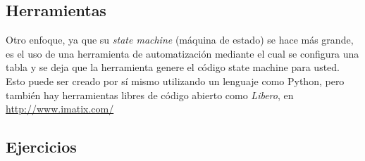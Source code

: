 \subsection*{Herramientas}
\label{subsec:Herramientas}

Otro enfoque, ya que su \textit{state machine} (máquina de estado) se hace más grande, es el uso de una herramienta de automatización mediante el cual se configura una tabla y se deja que la herramienta genere el código state machine para usted. Esto puede ser creado por sí mismo utilizando un lenguaje como Python, pero también hay herramientas libres de código abierto como \textit{Libero}, en \url{http://www.imatix.com/} \newline 


\subsection*{Ejercicios}
\label{subsec:Ejercicios}

